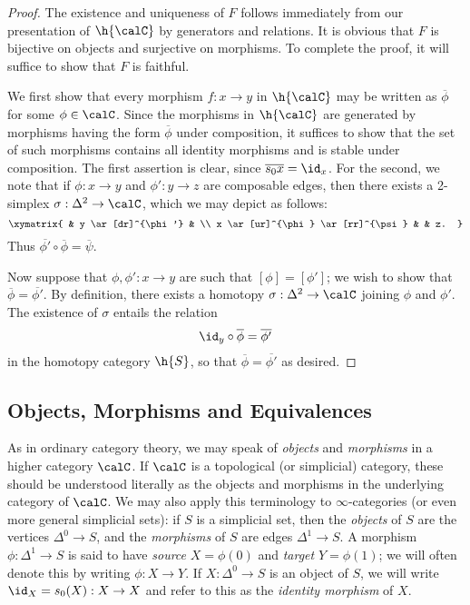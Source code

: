 \begin{proof}
The existence and uniqueness of $F$ follows immediately from our presentation
of $\h{\calC}$ by generators and relations. It is obvious that $F$ is bijective on objects and surjective on morphisms. To complete the proof, it will suffice to show that $F$ is faithful.

We first show that every morphism $f: x \rightarrow y$ in $\h{\calC}$ may be written as $\overline{\phi}$ for some $\phi \in \calC$. Since the morphisms in $\h{\calC}$ are generated by morphisms having the form $\overline{\phi}$ under composition, it suffices to show that the set of such morphisms contains all identity morphisms and is stable under composition. The first assertion is clear, since $\overline{ s_0 x}=\id_x$. For the second, we note that if $\phi: x \rightarrow y$ and $\phi': y \rightarrow z$ are composable edges, then there exists a 2-simplex $\sigma: \Delta^2 \rightarrow \calC$, which we may depict as follows:
$$ \xymatrix{ & y \ar[dr]^{\phi'} & \\
x \ar[ur]^{\phi} \ar[rr]^{\psi} & & z. }$$
Thus $\overline{ \phi' } \circ \overline{\phi} = \overline{ \psi }$.

Now suppose that $\phi,\phi': x \rightarrow y$ are such that $[\phi]=[\phi']$; we wish to show that $\overline{\phi}=\overline{\phi'}$. By definition, there exists a homotopy $\sigma: \Delta^2 \rightarrow \calC$ joining $\phi$ and $\phi'$. The existence of $\sigma$ entails the relation
$$ \id_y \circ \overline{\phi} = \overline{\phi'} $$ in the homotopy category $\h{S}$, so that
$\overline{\phi} = \overline{\phi'}$ as desired.
\end{proof}

\subsection{Objects, Morphisms and Equivalences}\label{obmor}

As in ordinary category theory, we may speak of {\it objects} and {\it morphisms} in a higher category $\calC$. If $\calC$ is a topological (or simplicial) category, these
should be understood literally as the objects and morphisms in the
underlying category of $\calC$. We may also apply this terminology
to $\infty$-categories (or even more general simplicial sets): if $S$ is a simplicial set, then the {\it
objects} of $S$ are the vertices $\Delta^0 \rightarrow S$, and the {\it morphisms}
of $S$ are edges $\Delta^1 \rightarrow S$. A morphism $\phi: \Delta^1 \rightarrow S$ is said to have {\it source} $X= \phi(0)$ and {\it target} $Y= \phi(1)$;
we will often denote this by writing $\phi: X \rightarrow Y$.
If $X: \Delta^0 \rightarrow S$ is an object of $S$, we will write
$\id_X = s_0(X): X \rightarrow X$ and refer to this as the {\it identity morphism} of $X$.

